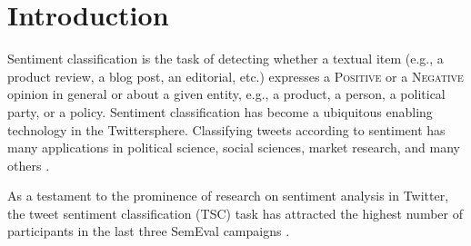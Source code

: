 \documentclass[11pt,letterpaper]{article}
\newif\ifdraft
\newcommand{\fabrizio}[1]{\ifdraft{\textcolor{cyan}{[Fabrizio]: {#1}}}\else{\vspace{0ex}}\fi}
\begin{document}
\section{Introduction}
\label{sec:intro}

\noindent Sentiment classification is the task of detecting whether a
textual item (e.g., a product review, a blog post, an editorial, etc.)
expresses a \textsc{Positive} or a \textsc{Negative} opinion in general or about a given entity, e.g.,
a product, a person, a political party, or a policy. 
Sentiment classification has become
a ubiquitous enabling technology in the Twittersphere. Classifying
tweets according to sentiment has many applications in political
science, social sciences, market research, and many others
\cite{Martinez-Camara:2014qd,Mejova:2015th}. %

As a testament to the prominence of research on sentiment analysis
in Twitter, the tweet sentiment classification (TSC)
task has attracted the highest number of participants in the last three SemEval 
campaigns
\cite{Nakov:2013ty,Rosenthal:2014ty,Rosenthal:2015ty,Nakov:2016rm}.
\end{document}
